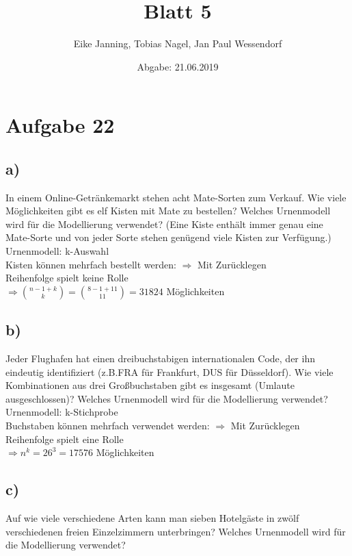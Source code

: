 \documentclass[paper = a4, ngerman]{scrartcl}
\title{Blatt 5}
\author{Eike Janning, Tobias Nagel, Jan Paul Wessendorf}
\date{Abgabe: 21.06.2019}
\begin{document}
	\maketitle
	\hrulefill
	
	\section*{Aufgabe 22}
	
	\subsection*{a)}
	In einem Online-Getränkemarkt stehen acht Mate-Sorten zum Verkauf. Wie viele Möglichkeiten gibt es elf Kisten mit Mate zu bestellen? Welches Urnenmodell wird für die Modellierung verwendet? (Eine Kiste enthält immer genau eine Mate-Sorte und von jeder Sorte stehen genügend viele Kisten zur Verfügung.)\\
	
	Urnenmodell: k-Auswahl\\
	
	Kisten können mehrfach bestellt werden: $\Rightarrow$ Mit Zurücklegen\\
	Reihenfolge spielt keine Rolle\\
	
	$\Rightarrow \binom{n-1+k}{k}= \binom{8-1+11}{11} = 31824$ Möglichkeiten
	
	
	
	\subsection*{b)}
	Jeder Flughafen hat einen dreibuchstabigen internationalen Code, der ihn eindeutig identifiziert (z.B.FRA für Frankfurt, DUS für Düsseldorf). Wie viele Kombinationen aus drei Großbuchstaben gibt es insgesamt (Umlaute ausgeschlossen)? Welches Urnenmodell wird für die Modellierung verwendet?\\
	
	Urnenmodell: k-Stichprobe\\
	
	Buchstaben können mehrfach verwendet werden: $\Rightarrow$ Mit Zurücklegen\\
	Reihenfolge spielt eine Rolle\\
	
	$\Rightarrow n^k = 26^3 =17576$ Möglichkeiten
	
	\subsection*{c)}
	Auf wie viele verschiedene Arten kann man sieben Hotelgäste in zwölf verschiedenen freien Einzelzimmern unterbringen? Welches Urnenmodell wird für die Modellierung verwendet? \\
	
\end{document}
